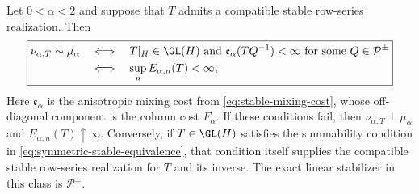 \begin{theorem}
\label{thm:complete-criterion-symmetric-stable-coordinates}
Let \(0<\alpha<2\) and suppose that \(T\) admits a compatible stable
row-series realization.  Then
\begin{equation}
 \boxed{\begin{aligned}
 \nu_{\alpha,T}\sim\mu_\alpha
 &\quad\Longleftrightarrow\quad
 T|_H\in\GL(H)\ \text{and}\
 \mathfrak e_\alpha(TQ^{-1})<\infty
       \ \text{for some }Q\in\mathcal P^{\pm}\\
 &\quad\Longleftrightarrow\quad
 \sup_nE_{\alpha,n}(T)<\infty,
 \end{aligned}}
 \label{eq:symmetric-stable-equivalence}
\end{equation}
Here \(\mathfrak e_\alpha\) is the anisotropic mixing cost from
\eqref{eq:stable-mixing-cost}, whose off-diagonal component is the column
cost \(F_\alpha\).
If these conditions fail, then
\(\nu_{\alpha,T}\perp\mu_\alpha\) and
\(E_{\alpha,n}(T)\uparrow\infty\).
Conversely, if \(T\in\GL(H)\) satisfies the summability condition in
\eqref{eq:symmetric-stable-equivalence}, that condition itself supplies the
compatible stable row-series realization for \(T\) and its inverse.
The exact linear stabilizer in this class is \(\mathcal P^{\pm}\).
\end{theorem}

